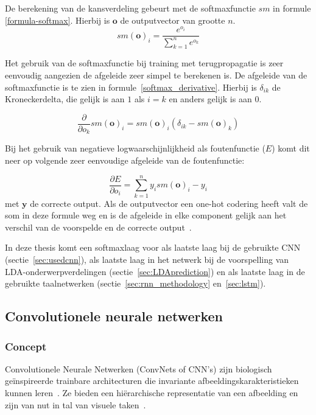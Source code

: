 De berekening van de kansverdeling gebeurt met de softmaxfunctie $sm$ in formule \eqref{formula-softmax}. Hierbij is $\mathbf{o}$ de outputvector van grootte $n$.
\begin{equation}
sm(\textbf{o})_i = \frac{e^{o_i}}{\sum^{n}_{k=1}{e^{o_k}}}
\label{formula-softmax}
\end{equation}

Het gebruik van de softmaxfunctie bij training met terugpropagatie is zeer eenvoudig aangezien de afgeleide zeer simpel te berekenen is. De afgeleide van de softmaxfunctie is te zien in formule~\eqref{softmax_derivative}. Hierbij is $\delta_{ik}$ de Kroneckerdelta, die gelijk is aan $1$ als $i = k$ en anders gelijk is aan $0$.

\begin{equation}
    \frac{\partial}{\partial o_k}sm(\textbf{o})_i =  sm(\textbf{o})_i(\delta_{ik} - sm(\textbf{o})_k)
    \label{softmax_derivative}
\end{equation}

Bij het gebruik van negatieve logwaarschijnlijkheid als foutenfunctie ($E$) komt dit neer op volgende zeer eenvoudige afgeleide van de foutenfunctie:

\begin{equation}
    \frac{\partial E}{\partial o_i} = \sum_{k=1}^n{y_i}sm(\textbf{o})_i - y_i
\end{equation}
met $\textbf{y}$ de correcte output. Als de outputvector een one-hot codering heeft valt de som in deze formule weg en is de afgeleide in elke component gelijk aan het verschil van de voorspelde en de correcte output~\cite{Bishop:1995:NNP:525960}. 

In deze thesis komt een softmaxlaag voor als laatste laag bij de gebruikte CNN \mbox{(sectie \ref{sec:usedcnn})}, als laatste laag in het netwerk bij de voorspelling van LDA-onderwerpverde\-lingen (sectie~\ref{sec:LDAprediction}) en als laatste laag in de gebruikte taalnetwerken (sectie~\ref{sec:rnn_methodology} en~\ref{sec:lstm}).

\subsection{Convolutionele neurale netwerken}
\label{sec:CNN}
\subsubsection{Concept}
Convolutionele Neurale Netwerken (ConvNets of CNN's) zijn biologisch ge\" inspireerde trainbare architecturen die invariante afbeeldingskarakteristieken kunnen leren~\cite{LeCun2010}. Ze bieden een hi\"erarchische representatie van een afbeelding en zijn van nut in tal van visuele taken~\cite{Ciresan2012,Girshick2014,Zhou2015}.

